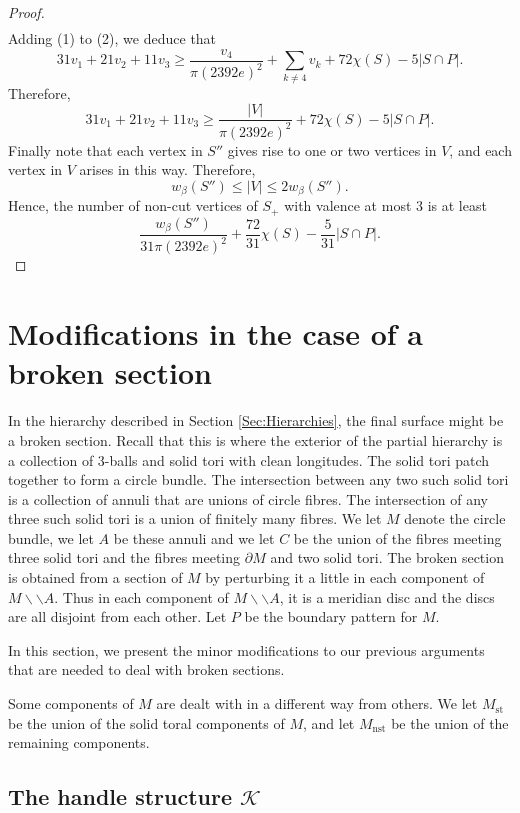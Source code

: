 \documentclass[oneside]{amsart}
\numberwithin{equation}{section}
\theoremstyle{plain}
\theoremstyle{definition}
\newcommand{\cut}{\backslash\backslash}
\begin{document}
\begin{proof}
\begin{equation}
\begin{split}
\end{split}
\tag{2}
\end{equation}
Adding (1) to (2), we deduce that
$$
31v_1 + 21 v_2 + 11 v_3 \geq 
\frac{v_4}{\pi (2392e)^2} + \sum_{k \not= 4} v_k +72\chi(S) -5  |S \cap P| .$$
Therefore,
$$31v_1 + 21 v_2 + 11 v_3 \geq \frac{|V|}{\pi (2392e)^2} + 72 \chi(S) - 5|S \cap P|.$$
Finally note that each vertex in $S''$ gives rise to one or two
vertices in $V$, and each vertex in $V$ arises in this way. Therefore,
$$w_\beta(S'') \leq |V| \leq 2 w_\beta(S'').$$
Hence, the number of non-cut vertices of $S_+$ with valence at most 3 is at least
$$\frac{w_\beta(S'')}{31\pi (2392e)^2} +  \frac{72}{31}\chi(S) - \frac{5}{31}|S \cap P|.$$
\end{proof}

\section{Modifications in the case of a broken section}
\label{Sec:BrokenSection}

In the hierarchy described in Section \ref{Sec:Hierarchies}, the final surface might be a broken section.
Recall that this is where the exterior of the partial hierarchy is a collection of 3-balls and solid tori
with clean longitudes. The solid tori patch together to form a circle bundle. The intersection between any
two such solid tori is a collection of annuli that are unions of circle fibres. The intersection of any three such solid
tori is a union of finitely many fibres. We let $M$ denote the circle bundle, we let $A$ be these annuli and we
let $C$ be the union of the fibres meeting three solid tori and the fibres meeting $\partial M$ and two solid tori.
The broken section is obtained from a section of $M$ by perturbing it a little
in each component of $M \cut A$. Thus in each component of $M \cut A$, it is a meridian disc and the discs
are all disjoint from each other. Let $P$ be the boundary pattern for $M$. 

In this section, we present the minor modifications to our previous arguments that
are needed to deal with broken sections.

Some components of $M$ are dealt with in a different way from others. We let $M_{\text{st}}$ be the
union of the solid toral components of $M$, and let $M_{\text{nst}}$ be the union of the 
remaining components.

\subsection{The handle structure $\mathcal{K}$}
\end{document}

